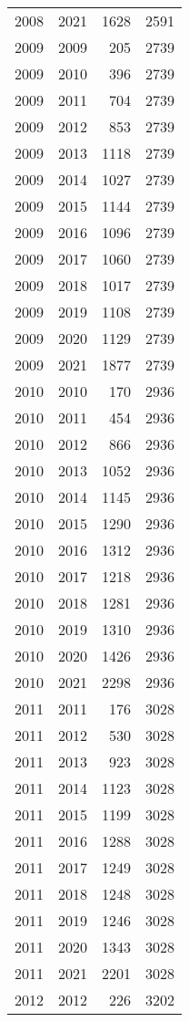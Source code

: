 \documentclass[
  11pt,
  letterpaper,
  DIV=11,
  numbers=noendperiod,
  twoside]{scrartcl}
\begin{document}
\begin{longtable}[]{@{}rrrr@{}}
2008 & 2021 & 1628 & 2591 \\
2009 & 2009 & 205 & 2739 \\
2009 & 2010 & 396 & 2739 \\
2009 & 2011 & 704 & 2739 \\
2009 & 2012 & 853 & 2739 \\
2009 & 2013 & 1118 & 2739 \\
2009 & 2014 & 1027 & 2739 \\
2009 & 2015 & 1144 & 2739 \\
2009 & 2016 & 1096 & 2739 \\
2009 & 2017 & 1060 & 2739 \\
2009 & 2018 & 1017 & 2739 \\
2009 & 2019 & 1108 & 2739 \\
2009 & 2020 & 1129 & 2739 \\
2009 & 2021 & 1877 & 2739 \\
2010 & 2010 & 170 & 2936 \\
2010 & 2011 & 454 & 2936 \\
2010 & 2012 & 866 & 2936 \\
2010 & 2013 & 1052 & 2936 \\
2010 & 2014 & 1145 & 2936 \\
2010 & 2015 & 1290 & 2936 \\
2010 & 2016 & 1312 & 2936 \\
2010 & 2017 & 1218 & 2936 \\
2010 & 2018 & 1281 & 2936 \\
2010 & 2019 & 1310 & 2936 \\
2010 & 2020 & 1426 & 2936 \\
2010 & 2021 & 2298 & 2936 \\
2011 & 2011 & 176 & 3028 \\
2011 & 2012 & 530 & 3028 \\
2011 & 2013 & 923 & 3028 \\
2011 & 2014 & 1123 & 3028 \\
2011 & 2015 & 1199 & 3028 \\
2011 & 2016 & 1288 & 3028 \\
2011 & 2017 & 1249 & 3028 \\
2011 & 2018 & 1248 & 3028 \\
2011 & 2019 & 1246 & 3028 \\
2011 & 2020 & 1343 & 3028 \\
2011 & 2021 & 2201 & 3028 \\
2012 & 2012 & 226 & 3202 \\

\end{longtable}
\end{document}
